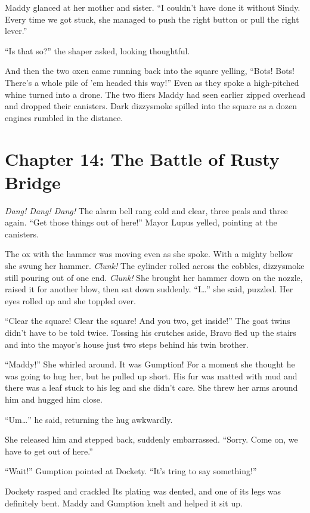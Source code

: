 \documentclass[10pt]{article}
\begin{document}
Maddy glanced at her mother and sister. ``I couldn't have done it
without Sindy. Every time we got stuck, she managed to push the right
button or pull the right lever.''

``Is that so?'' the shaper asked, looking thoughtful.

And then the two oxen came running back into the square yelling, ``Bots!
Bots! There's a whole pile of 'em headed this way!'' Even as they spoke
a high-pitched whine turned into a drone. The two fliers Maddy had seen
earlier zipped overhead and dropped their canisters. Dark dizzysmoke
spilled into the square as a dozen engines rumbled in the distance.

\newpage
\section{Chapter 14: The Battle of Rusty Bridge}

\emph{Dang! Dang! Dang!} The alarm bell rang cold and clear, three peals
and three again. ``Get those things out of here!'' Mayor Lupus yelled,
pointing at the canisters.

The ox with the hammer was moving even as she spoke. With a mighty
bellow she swung her hammer. \emph{Clunk!} The cylinder rolled across
the cobbles, dizzysmoke still pouring out of one end. \emph{Clunk!} She
brought her hammer down on the nozzle, raised it for another blow, then
sat down suddenly. ``I\ldots{}'' she said, puzzled. Her eyes rolled up
and she toppled over.

``Clear the square! Clear the square! And you two, get inside!'' The
goat twins didn't have to be told twice. Tossing his crutches aside,
Bravo fled up the stairs and into the mayor's house just two steps
behind his twin brother.

``Maddy!'' She whirled around. It was Gumption! For a moment she thought
he was going to hug her, but he pulled up short. His fur was matted with
mud and there was a leaf stuck to his leg and she didn't care. She threw
her arms around him and hugged him close.

``Um\ldots{}'' he said, returning the hug awkwardly.

She released him and stepped back, suddenly embarrassed. ``Sorry. Come
on, we have to get out of here.''

``Wait!'' Gumption pointed at Dockety. ``It's tring to say something!''

Dockety rasped and crackled Its plating was dented, and one of its legs
was definitely bent. Maddy and Gumption knelt and helped it sit up.
\end{document}
